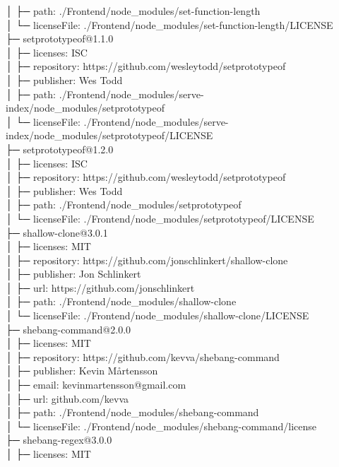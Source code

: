 │  ├─ path: ./Frontend/node\_modules/set-function-length\\
│  └─ licenseFile: ./Frontend/node\_modules/set-function-length/LICENSE\\
├─ setprototypeof@1.1.0\\
│  ├─ licenses: ISC\\
│  ├─ repository: https://github.com/wesleytodd/setprototypeof\\
│  ├─ publisher: Wes Todd\\
│  ├─ path: ./Frontend/node\_modules/serve-index/node\_modules/setprototypeof\\
│  └─ licenseFile: ./Frontend/node\_modules/serve-index/node\_modules/setprototypeof/LICENSE\\
├─ setprototypeof@1.2.0\\
│  ├─ licenses: ISC\\
│  ├─ repository: https://github.com/wesleytodd/setprototypeof\\
│  ├─ publisher: Wes Todd\\
│  ├─ path: ./Frontend/node\_modules/setprototypeof\\
│  └─ licenseFile: ./Frontend/node\_modules/setprototypeof/LICENSE\\
├─ shallow-clone@3.0.1\\
│  ├─ licenses: MIT\\
│  ├─ repository: https://github.com/jonschlinkert/shallow-clone\\
│  ├─ publisher: Jon Schlinkert\\
│  ├─ url: https://github.com/jonschlinkert\\
│  ├─ path: ./Frontend/node\_modules/shallow-clone\\
│  └─ licenseFile: ./Frontend/node\_modules/shallow-clone/LICENSE\\
├─ shebang-command@2.0.0\\
│  ├─ licenses: MIT\\
│  ├─ repository: https://github.com/kevva/shebang-command\\
│  ├─ publisher: Kevin Mårtensson\\
│  ├─ email: kevinmartensson@gmail.com\\
│  ├─ url: github.com/kevva\\
│  ├─ path: ./Frontend/node\_modules/shebang-command\\
│  └─ licenseFile: ./Frontend/node\_modules/shebang-command/license\\
├─ shebang-regex@3.0.0\\
│  ├─ licenses: MIT\\
